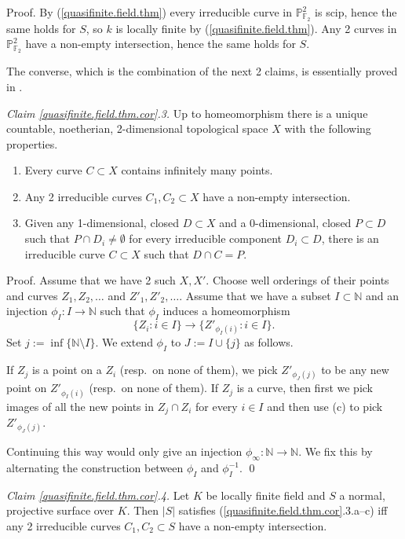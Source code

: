 \documentclass{amsart}
\theoremstyle{definition}
\theoremstyle{remark}
\newcommand{\n}[0]{{\mathbb N}}
\newcommand{\p}[0]{{\mathbb P}}
\newcommand{\f}[0]{{\mathbb F}}
\begin{document}
Proof.  By (\ref{quasifinite.field.thm}) every irreducible curve in
$\p^2_{\f_2}$ is scip, hence the same holds for $S$, so $k$ is locally finite by (\ref{quasifinite.field.thm}). 
Any 2 curves in $\p^2_{\f_2}$ have a non-empty intersection, hence the same holds for $S$. 

The converse, which is the combination of the next 2 claims,  is essentially proved  in \cite{MR624904}.



\medskip
{\it Claim \ref{quasifinite.field.thm.cor}.3.} 
 Up to homeomorphism there is a unique countable, noetherian, 2-dimensional topological space $X$ with the following properties.
\begin{enumerate}
\item[(a)] Every curve $C\subset X$ contains infinitely many points.
\item[(b)] Any 2 irreducible curves $C_1, C_2\subset X$ have a non-empty intersection.
\item[(c)] Given any 1-dimensional, closed $D\subset X$ and a 0-dimensional, closed $P\subset D$ such that $P\cap D_i\neq \emptyset$ for every irreducible component $D_i\subset D$, there is an  irreducible curve $C\subset X$
such that $D\cap C=P$.
\end{enumerate}


 Proof. Assume that we have 2 such $X, X'$. Choose well orderings of their points and curves  $Z_1, Z_2, \dots$ and  $Z'_1, Z'_2, \dots$.
Assume that we have a subset $I\subset \n$ and an injection
$\phi_I:I\to \n$ such that $\phi_I$ induces a homeomorphism
$$
\{Z_i: i\in I\}\longrightarrow \{Z'_{\phi_I(i)}: i\in I\}.
$$
Set $j:=\inf\{\n\setminus I\}$. We extend $\phi_I$ to
$J:=I\cup\{j\}$ as follows.

If $Z_j$ is a point on a $Z_i$ (resp.\ on none of them), we pick $Z'_{\phi_J(j)}$ to be any new point on  $Z'_{\phi_I(i)}$ (resp.\ on none of them).
If $Z_j$ is a curve, then first we pick images of all the new points in
$Z_j\cap Z_i$ for every $ i\in I$ and then use (c) to pick $Z'_{\phi_J(j)}$.

Continuing this way would only give an injection $\phi_{\infty}:\n\to\n$.
We fix this by alternating the construction between $\phi_I$ and
$\phi_I^{-1}$. \qed



\medskip
{\it Claim \ref{quasifinite.field.thm.cor}.4.} Let $K$ be locally finite field and $S$ a normal, projective surface over $K$. Then $|S|$ satisfies
(\ref{quasifinite.field.thm.cor}.3.a--c) iff  any 2 irreducible curves $C_1, C_2\subset S$ have a non-empty intersection.
\medskip
\end{document}
